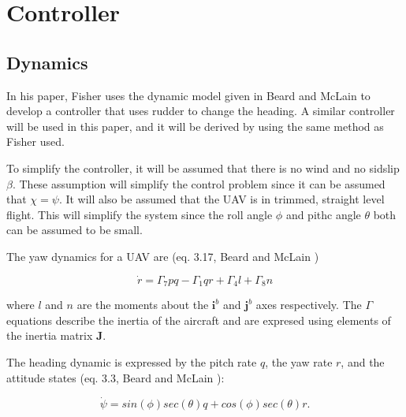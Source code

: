 \section{Controller}

\subsection{Dynamics}
In his paper, Fisher \cite{ratcFISHER} uses the dynamic model given in Beard and McLain \cite{suaBEARD} to develop a controller that uses rudder to change the heading. A similar controller will be used in this paper, and it will be derived by using the same method as Fisher used.

To simplify the controller, it will be assumed that there is no wind and no sidslip $\beta$. These assumption will simplify the control problem since it can be assumed that $\chi = \psi$. It will also be assumed that the UAV is in trimmed, straight level flight. This will simplify the system since the roll angle $\phi$ and pithc angle $\theta$ both can be assumed to be small.

The yaw dynamics for a UAV are (eq. 3.17, Beard and McLain \cite{suaBEARD})

\begin{equation}
	\dot{r} = \Gamma_7pq - \Gamma_1qr + \Gamma_4l + \Gamma_8n
	\label{eq:yaw_dynamics}
\end{equation}

where $l$ and $n$ are the moments about the $\bm{i}^b$ and $\bm{j}^b$ axes respectively. The $\Gamma$ equations describe the inertia of the aircraft and are expresed using elements of the inertia matrix $\bm{J}$.


The heading dynamic is expressed by the pitch rate $q$, the yaw rate $r$, and the attitude states (eq. 3.3, Beard and McLain \cite{suaBEARD}):

\begin{equation}
	\dot{\psi} = sin(\phi)sec(\theta)q + cos(\phi)sec(\theta)r.
\end{equation}

